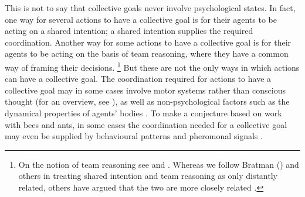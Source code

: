 \documentclass[12pt,a4paper]{extarticle}
\begin{document}
This is not to say that collective goals never involve psychological states.
In fact,
one way for several actions to have a collective goal is for their agents to be acting on a shared intention; 
a shared intention supplies the required coordination.
Another way for some actions to have a collective goal is for their agents to be acting on the basis of team reasoning, where they have a common way of framing their decisions.%
%
\footnote{
On the notion of team reasoning see \citet{Bacharach:2006fk} and \citet{Sugden:2000mw}.
Whereas we follow 
Bratman (\citeyear[p.\ 150]{Bratman:2009lv})
and others 
in treating shared intention and team reasoning as only distantly related,
others have argued that the two are more closely related 
\citep[e.g.][]{Gold:2007zd,pacherie_framing_2011}.
}
%
But these are not the only ways in which actions can have a collective goal.
The coordination required for actions to have a collective goal may in some cases involve motor systems rather than conscious thought (for an overview, see \citet{Knoblich:2010fk}),
as well as non-psychological factors such as the dynamical properties of agents' bodies \citep[e.g.][]{schmidt_richardons:_2008}.
To make a conjecture based on work with bees and ants, in some cases
the coordination needed for a collective goal may even be supplied by 
	 behavioural patterns \citep{seeley2010honeybee}  
	 and 
	 pheromonal signals \citep[pp.\ 178-83, 206-21]{hoelldobler2009superorganism}.
\end{document}

